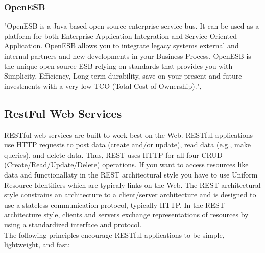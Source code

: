 \documentclass[12pt]{article}
\begin{document}
\subsubsection{OpenESB}
"OpenESB is a Java based open source enterprise service bus. It can be used as a platform for both Enterprise Application Integration and Service Oriented Application. OpenESB allows you to integrate legacy systems external and internal partners and new developments in your Business Process.  OpenESB is the unique open source ESB relying on standards that provides you with Simplicity, Efficiency, Long term durability, save on your present and future investments with a very low TCO (Total Cost of Ownership).", \cite{Aboutopenesb}


\subsection{RestFul Web Services}
RESTful web services are built to work best on the Web. RESTful applications use HTTP requests to post data (create and/or update), read data (e.g., make queries), and delete data. Thus, REST uses HTTP for all four CRUD (Create/Read/Update/Delete) operations. If you want to access resources like data and functionallaty in the REST architectural style you have to use Uniform Resource Identifiers which are typicaly links 
on the Web. The REST architectural style constrains an architecture to a client/server architecture and is designed to use a stateless communication protocol, typically HTTP. In the REST architecture style, clients and servers exchange representations of resources by using a standardized interface and protocol. \\
The following principles encourage RESTful applications to be simple, lightweight, and fast:
\\
\end{document}

